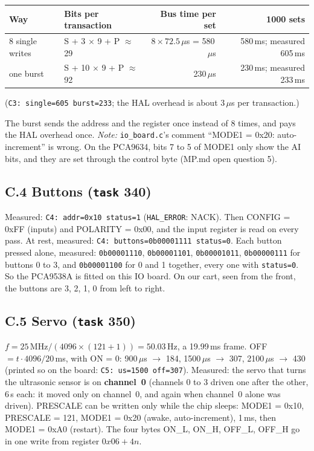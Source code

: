 \documentclass[11pt,a4paper]{article}
\newcommand{\lv}[1]{\texttt{#1}}                 %
\begin{document}
\smallskip\noindent
\begin{tabularx}{\textwidth}{@{}l L r r@{}}
\toprule
Way & Bits per transaction & Bus time per set & 1000 sets \\
 single writes & S + 3 $\times$ 9 + P $\approx$ 29 & $8 \times 72.5\,\mu$s = 580\,$\mu$s & 580\,ms; measured 605\,ms \\
one burst & S + 10 $\times$ 9 + P $\approx$ 92 & 230\,$\mu$s & 230\,ms; measured 233\,ms \\
\bottomrule
\end{tabularx}

\noindent (\texttt{C3: single=605 burst=233}; the HAL overhead is about 3\,$\mu$s per transaction.)

\noindent The burst sends the address and the register once instead of 8 times, and pays the HAL overhead once.
\emph{Note:} \texttt{io\_board.c}'s comment ``MODE1 = 0x20: auto-increment'' is wrong. On the PCA9634, bits 7 to 5 of
MODE1 only show the AI bits, and they are set through the control byte (MP.md open question 5).

\subsection*{C.4 Buttons (\lv{task} 340)}
Measured: \texttt{C4: addr=0x10 status=1} (\texttt{HAL\_ERROR}: NACK). Then CONFIG = 0xFF (inputs) and
POLARITY = 0x00, and the input register is read on every pass. At rest, measured: \texttt{C4: buttons=0b00001111
status=0}. Each button pressed alone, measured: \texttt{0b00001110}, \texttt{0b00001101}, \texttt{0b00001011},
\texttt{0b00000111} for buttons 0 to 3, and \texttt{0b00001100} for 0 and 1 together, every one with
\texttt{status=0}. So the PCA9538A is fitted on this IO board. On our cart, seen from the front, the buttons are 3,
2, 1, 0 from left to right.

\subsection*{C.5 Servo (\lv{task} 350)}
$f = 25\,\mathrm{MHz} / (4096 \times (121 + 1)) = 50.03$\,Hz, a 19.99\,ms frame. OFF $= t \cdot 4096 / 20\,$ms, with
ON = 0: 900\,$\mu$s $\to$ 184, 1500\,$\mu$s $\to$ 307, 2100\,$\mu$s $\to$ 430 (printed so on the board:
\texttt{C5: us=1500 off=307}). Measured: the servo that turns the ultrasonic sensor is on \textbf{channel~0}
(channels 0 to 3 driven one after the other, 6\,s each: it moved only on channel~0, and again when channel~0 alone was
driven).
PRESCALE can be written only while the chip sleeps: MODE1 = 0x10, PRESCALE = 121, MODE1 = 0x20 (awake,
auto-increment), 1\,ms, then MODE1 = 0xA0 (restart). The four bytes ON\_L, ON\_H, OFF\_L, OFF\_H go in one write from
register $0x06 + 4n$.
\end{document}
